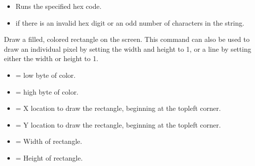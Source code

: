 \documentclass[letterpaper,10pt,english]{sphinxmanual}
\begin{document}
\begin{description}
\begin{description}
\begin{itemize}
\end{itemize}

\begin{itemize}
\item {} 
\sphinxAtStartPar
Runs the specified hex code.

\end{itemize}

\begin{itemize}
\item {} 
\sphinxAtStartPar
{} if there is an invalid hex digit or an odd number of characters in the string.

\end{itemize}

\end{description}

\sphinxAtStartPar
Draw a filled, colored rectangle on the screen. This command can also be used to draw an individual pixel by setting the width and height to 1, or a line by setting either the width or height to 1.
\begin{description}
\begin{itemize}
\item {} 
\sphinxAtStartPar
{} = low byte of color.

\item {} 
\sphinxAtStartPar
{} = high byte of color.

\item {} 
\sphinxAtStartPar
{} = X location to draw the rectangle, beginning at the top\sphinxhyphen{}left corner.

\item {} 
\sphinxAtStartPar
{} = Y location to draw the rectangle, beginning at the top\sphinxhyphen{}left corner.

\item {} 
\sphinxAtStartPar
{} = Width of rectangle.

\item {} 
\sphinxAtStartPar
{} = Height of rectangle.

\end{itemize}

\end{description}


\end{description}
\end{document}
